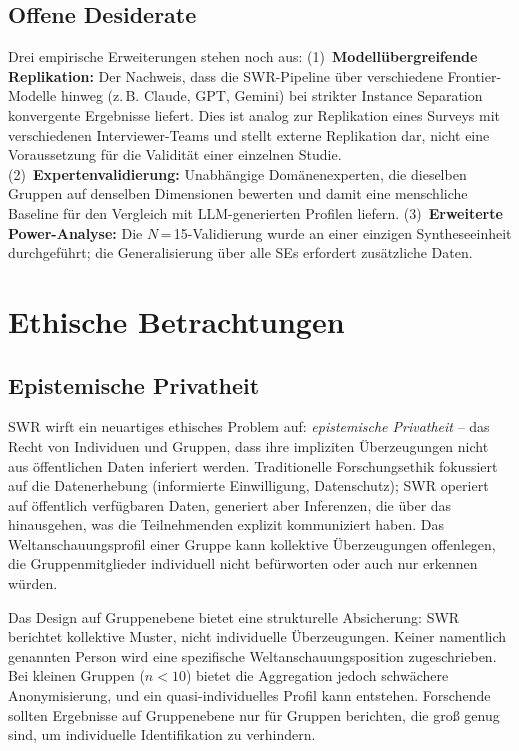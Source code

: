 \documentclass[11pt,a4paper]{article}
\begin{document}
\subsection{Offene Desiderate}
\label{sec:limitations:desiderata}

Drei empirische Erweiterungen stehen noch aus: (1)~\textbf{Modellübergreifende Replikation:} Der Nachweis, dass die SWR-Pipeline über verschiedene Frontier-Modelle hinweg (z.\,B. Claude, GPT, Gemini) bei strikter Instance Separation konvergente Ergebnisse liefert. Dies ist analog zur Replikation eines Surveys mit verschiedenen Interviewer-Teams und stellt externe Replikation dar, nicht eine Voraussetzung für die Validität einer einzelnen Studie. (2)~\textbf{Expertenvalidierung:} Unabhängige Domänenexperten, die dieselben Gruppen auf denselben Dimensionen bewerten und damit eine menschliche Baseline für den Vergleich mit LLM-generierten Profilen liefern. (3)~\textbf{Erweiterte Power-Analyse:} Die $N$\,=\,15-Validierung wurde an einer einzigen Syntheseeinheit durchgeführt; die Generalisierung über alle SEs erfordert zusätzliche Daten.


\section{Ethische Betrachtungen}
\label{sec:ethics}

\subsection{Epistemische Privatheit}

SWR wirft ein neuartiges ethisches Problem auf: \emph{epistemische Privatheit} -- das Recht von Individuen und Gruppen, dass ihre impliziten Überzeugungen nicht aus öffentlichen Daten inferiert werden. Traditionelle Forschungsethik fokussiert auf die Datenerhebung (informierte Einwilligung, Datenschutz); SWR operiert auf öffentlich verfügbaren Daten, generiert aber Inferenzen, die über das hinausgehen, was die Teilnehmenden explizit kommuniziert haben. Das Weltanschauungsprofil einer Gruppe kann kollektive Überzeugungen offenlegen, die Gruppenmitglieder individuell nicht befürworten oder auch nur erkennen würden.

Das Design auf Gruppenebene bietet eine strukturelle Absicherung: SWR berichtet kollektive Muster, nicht individuelle Überzeugungen. Keiner namentlich genannten Person wird eine spezifische Weltanschauungsposition zugeschrieben. Bei kleinen Gruppen ($n < 10$) bietet die Aggregation jedoch schwächere Anonymisierung, und ein quasi-individuelles Profil kann entstehen. Forschende sollten Ergebnisse auf Gruppenebene nur für Gruppen berichten, die groß genug sind, um individuelle Identifikation zu verhindern.
\end{document}
